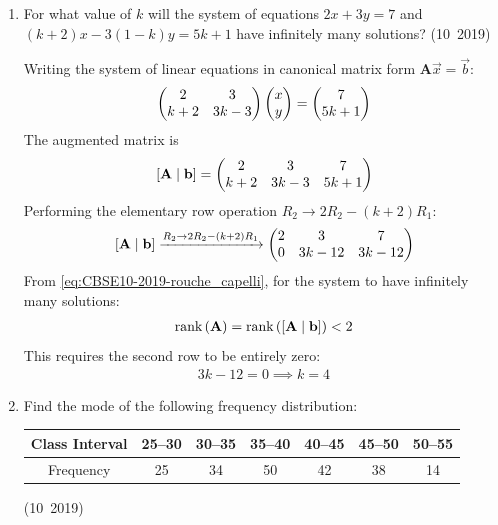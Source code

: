 \begin{enumerate}[label=\thesubsection.\arabic*, ref=\thesubsection.\theenumi]
	\solution
	The first term is $a = -\frac{9}{2}$. The common difference $d$ is:
	\begin{align}
		d = -3 - \brak{-\frac{9}{2}} = -3 + \frac{9}{2} = \frac{3}{2}
	\end{align}
	From \eqref{eq:CBSE10-2019-ap_nth_term}, the $n$-th term is:
	\begin{align}
		a_n = a + \brak{n - 1}d
	\end{align}
	Substituting $n = 21$:
	\begin{align}
		a_{21} &= -\frac{9}{2} + \brak{21 - 1}\brak{\frac{3}{2}} \\
		&= -\frac{9}{2} + 20\brak{\frac{3}{2}} = -\frac{9}{2} + 30 = \frac{51}{2} = 25\frac{1}{2}
	\end{align}
	
	\item For what value of $k$ will the system of equations $2x+3y=7$ and $(k+2)x-3(1-k)y=5k+1$ have infinitely many solutions?
	\hfill (10~2019)
	
	\solution
	Writing the system of linear equations in canonical matrix form $\mathbf{A}\vec{x} = \vec{b}$:
	\begin{align}
		\begin{pmatrix}2 & 3 \\ k+2 & 3k-3\end{pmatrix}\begin{pmatrix}x \\ y\end{pmatrix} = \begin{pmatrix}7 \\ 5k+1\end{pmatrix}
	\end{align}
	The augmented matrix is
	\begin{align}
		{}\left[\mathbf{A} \mid \mathbf{b}\right] = \begin{pmatrix}2 & 3 & 7 \\ k+2 & 3k-3 & 5k+1\end{pmatrix}
	\end{align}
	Performing the elementary row operation $R_2 \to 2R_2 - (k+2)R_1$:
	\begin{align}
		{}\left[\mathbf{A} \mid \mathbf{b}\right] \xrightarrow{R_2 \to 2R_2 - (k+2)R_1}
		\begin{pmatrix}2 & 3 & 7 \\ 0 & 3k-12 & 3k-12\end{pmatrix}
	\end{align}
	From \eqref{eq:CBSE10-2019-rouche_capelli}, for the system to have infinitely many solutions:
	\begin{align}
		\text{rank}\left(\mathbf{A}\right) = \text{rank}\left([\mathbf{A} \mid \mathbf{b}]\right) < 2
	\end{align}
	This requires the second row to be entirely zero:
	\begin{align}
		3k - 12 = 0 \implies k = 4
	\end{align}
	
	\item Find the mode of the following frequency distribution:
	\begin{center}
		\begin{tabular}{|c|c|c|c|c|c|c|}
			\hline
			Class Interval & 25--30 & 30--35 & 35--40 & 40--45 & 45--50 & 50--55\\
			\hline
			Frequency & 25 & 34 & 50 & 42 & 38 & 14\\
			\hline
		\end{tabular}
	\end{center}
	\hfill (10~2019)
	

\end{enumerate}

